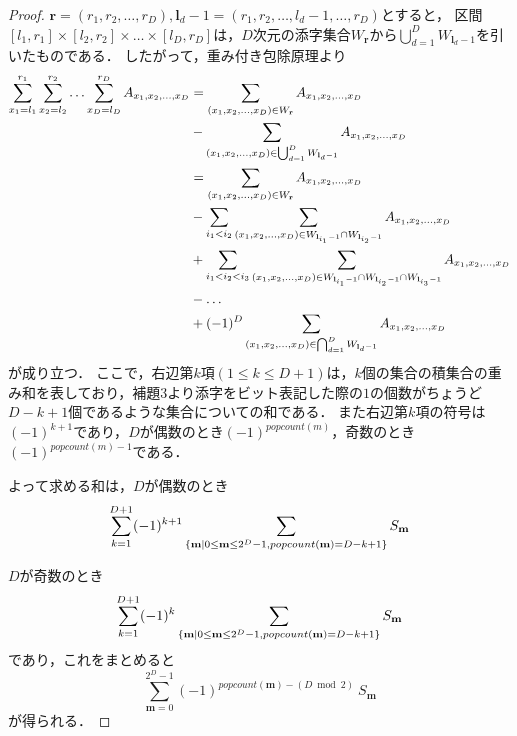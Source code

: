 \documentclass[12pt]{jsreport}
\theoremstyle{plain} %
\theoremstyle{definition}
\begin{document}
\begin{proof}
    $\mathbf{r} = (r_1, r_2, \ldots, r_D), \mathbf{l}_d-1 = (r_1, r_2, \ldots, l_d-1, \ldots, r_D)$とすると，
    区間$[l_1, r_1] \times [l_2, r_2] \times \ldots \times [l_D, r_D]$は，$D$次元の添字集合$W_{\mathbf{r}}$から$\bigcup_{d=1}^{D} W_{\mathbf{l}_d-1}$を引いたものである．
    したがって，重み付き包除原理より
    \begin{align}
        \sum_{x_1=l_1}^{r_1} \sum_{x_2=l_2}^{r_2} \ldots \sum_{x_D=l_D}^{r_D} A_{x_1, x_2, \ldots, x_D} &= \sum_{(x_1, x_2, \ldots, x_D) \in W_{\mathbf{r}}} A_{x_1, x_2, \ldots, x_D} \notag \\
        &- \sum_{(x_1, x_2, \ldots, x_D) \in \bigcup_{d=1}^{D} W_{\mathbf{l}_d-1}} A_{x_1, x_2, \ldots, x_D} \notag \\
        &= \sum_{(x_1, x_2, \ldots, x_D) \in W_{\mathbf{r}}} A_{x_1, x_2, \ldots, x_D} \notag \\
        &- \sum_{i_1<i_2} \sum_{(x_1, x_2, \ldots, x_D) \in W_{\mathbf{l}_{i_1}-1} \cap W_{\mathbf{l}_{i_2}-1}} A_{x_1, x_2, \ldots, x_D} \notag \\
        &+ \sum_{i_1<i_2<i_3} \sum_{(x_1, x_2, \ldots, x_D) \in W_{\mathbf{l}_{i_1}-1} \cap W_{\mathbf{l}_{i_2}-1} \cap W_{\mathbf{l}_{i_3}-1}} A_{x_1, x_2, \ldots, x_D} \notag \\
        &- \ldots \notag \\
        &+ (-1)^{D} \sum_{(x_1, x_2, \ldots, x_D) \in \bigcap_{d=1}^{D} W_{\mathbf{l}_d-1}} A_{x_1, x_2, \ldots, x_D} \notag \\
    \end{align}
    が成り立つ．
    ここで，右辺第$k$項$(1\leq k \leq D+1)$は，$k$個の集合の積集合の重み和を表しており，補題3より添字をビット表記した際の$1$の個数がちょうど$D-k+1$個であるような集合についての和である．
    また右辺第$k$項の符号は$(-1)^{k+1}$であり，$D$が偶数のとき$(-1)^{popcount(m)}$，奇数のとき$(-1)^{popcount(m)-1}$である．

    よって求める和は，$D$が偶数のとき
    \begin{equation}
        \sum_{k=1}^{D+1} (-1)^{k+1} \sum_{\{\mathbf{m} | 0\leq \mathbf{m} \leq 2^D-1, popcount(\mathbf{m}) = D-k+1\}} S_{\mathbf{m}} \notag
    \end{equation}

    $D$が奇数のとき
    \begin{equation}
        \sum_{k=1}^{D+1} (-1)^{k} \sum_{\{\mathbf{m} | 0\leq \mathbf{m} \leq 2^D-1, popcount(\mathbf{m}) = D-k+1\}} S_{\mathbf{m}} \notag
    \end{equation}
    であり，これをまとめると
    \begin{equation}
        \sum_{\mathbf{m}=0}^{2^D-1} (-1)^{popcount(\mathbf{m}) - (D \bmod 2)} \ S_{\mathbf{m}}
    \end{equation}
    が得られる．
\end{proof}
\end{document}
